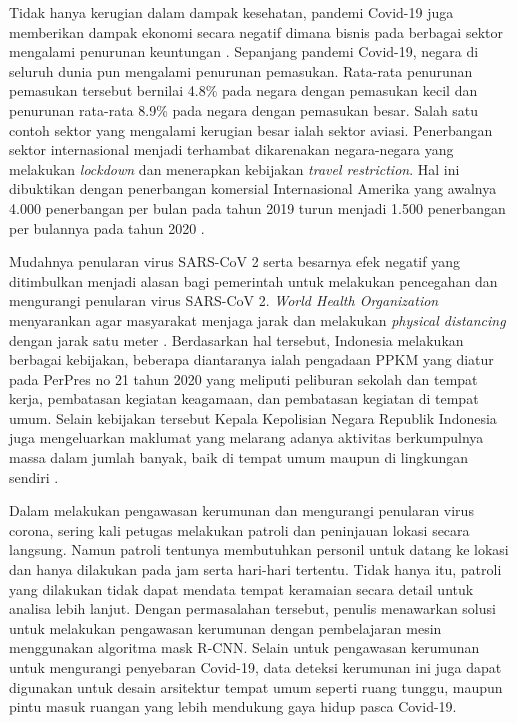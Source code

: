Tidak hanya kerugian dalam dampak kesehatan, pandemi Covid-19 juga memberikan dampak ekonomi secara negatif dimana
bisnis pada berbagai sektor mengalami penurunan keuntungan \cite{pmid34337569}.
Sepanjang pandemi Covid-19, negara di seluruh dunia pun mengalami penurunan
pemasukan.  Rata-rata penurunan pemasukan tersebut bernilai 4.8\% pada negara dengan pemasukan kecil dan penurunan rata-rata
8.9\% pada negara dengan pemasukan besar. Salah satu contoh sektor yang mengalami kerugian besar ialah sektor aviasi. Penerbangan sektor internasional
menjadi terhambat dikarenakan negara-negara yang melakukan \textit{lockdown} dan menerapkan kebijakan
\textit{travel restriction}. Hal ini dibuktikan dengan penerbangan komersial Internasional Amerika
yang awalnya 4.000 penerbangan per bulan pada tahun 2019 turun menjadi 1.500 penerbangan per
bulannya pada tahun 2020 \cite{TRUONG2021102126}.

Mudahnya penularan virus SARS-CoV 2 serta besarnya efek negatif yang ditimbulkan menjadi alasan bagi pemerintah untuk
melakukan pencegahan dan mengurangi penularan virus SARS-CoV 2. \textit{World Health Organization}
menyarankan agar masyarakat menjaga jarak dan melakukan \textit{physical distancing}
dengan jarak satu meter \cite{WHO2}. Berdasarkan hal tersebut, Indonesia melakukan berbagai
kebijakan, beberapa diantaranya ialah pengadaan PPKM yang diatur pada PerPres no 21 tahun 2020 yang meliputi
peliburan sekolah dan tempat kerja, pembatasan kegiatan keagamaan, dan pembatasan kegiatan di tempat umum.
Selain kebijakan tersebut Kepala Kepolisian Negara Republik Indonesia juga mengeluarkan maklumat
yang melarang adanya aktivitas berkumpulnya massa dalam jumlah banyak, baik di tempat umum maupun di lingkungan
sendiri \cite{DJALANTE2020100091}.

Dalam melakukan pengawasan kerumunan dan mengurangi penularan virus corona, sering kali petugas
melakukan patroli dan peninjauan lokasi secara langsung. Namun patroli tentunya membutuhkan personil untuk datang ke 
lokasi dan hanya dilakukan pada jam serta hari-hari tertentu. Tidak hanya itu, patroli yang dilakukan tidak dapat
mendata tempat keramaian secara detail untuk analisa lebih lanjut. Dengan permasalahan tersebut,
penulis menawarkan solusi untuk melakukan pengawasan kerumunan dengan pembelajaran mesin menggunakan
algoritma mask R-CNN. Selain untuk pengawasan kerumunan untuk mengurangi penyebaran Covid-19, data
deteksi kerumunan ini juga dapat digunakan untuk desain arsitektur tempat umum seperti ruang tunggu,
maupun pintu masuk ruangan yang lebih mendukung gaya hidup pasca Covid-19.

